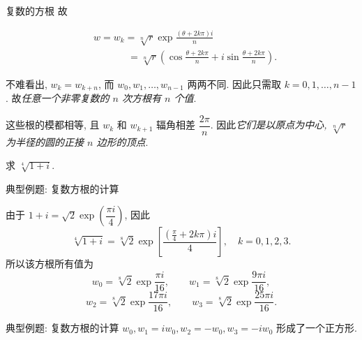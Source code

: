 \begin{frame}{复数的方根}
\onslide<+->
故
\begin{alertblock@}
\begin{align*}
	&w=w_k=\sqrt[n]r\exp\frac{(\theta+2k\pi)i}n\\
	&\hspace{42pt}=\sqrt[n]r\left(\cos\frac{\theta+2k\pi}n+i\sin\frac{\theta+2k\pi}n\right).
\end{align*}
\end{alertblock@}
\onslide<+->
不难看出, $w_k=w_{k+n}$, 而 $w_0,w_1,\dots,w_{n-1}$ 两两不同.
\onslide<+->
因此只需取 \alert{$k=0,1,\dots,n-1$}.
\onslide<+->
故\emph{任意一个非零复数的 $n$ 次方根有 $n$ 个值}.

\onslide<+->
这些根的模都相等, 且 $w_k$ 和 $w_{k+1}$ 辐角相差 $\dfrac{2\pi}n$.
\onslide<+->
因此\emph{它们是以原点为中心, $\sqrt[n]r$ 为半径的圆的正接 $n$ 边形的顶点}.

\onslide<+->
\begin{example}
求 $\sqrt[4]{1+i}$.
\end{example}
\end{frame}


\begin{frame}{典型例题: 复数方根的计算}
\begin{solution}
由于 $1+i=\sqrt2\exp\left(\dfrac{\pi i}4\right)$,
\onslide<+->
因此
\[\sqrt[4]{1+i}=\sqrt[8]2\exp\left[\frac{(\frac\pi4+2k\pi)i}4\right],\quad k=0,1,2,3.\]
\onslide<+->
所以该方根所有值为
\[w_0=\sqrt[8]2\exp\frac{\pi i}{16},\qquad
w_1=\sqrt[8]2\exp\frac{9\pi i}{16},\]
\[w_2=\sqrt[8]2\exp\frac{17\pi i}{16},\qquad
w_3=\sqrt[8]2\exp\frac{25\pi i}{16}.\]
\end{solution}
\end{frame}


\begin{frame}{典型例题: 复数方根的计算}
\onslide<+->
$w_0,w_1=iw_0,w_2=-w_0,w_3=-iw_0$ 形成了一个正方形.
\onslide<+->
\begin{center}
\end{center}
\end{frame}


